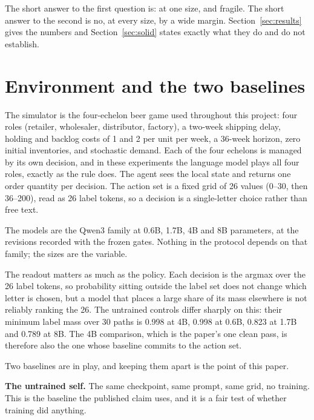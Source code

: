 \documentclass[11pt]{article}
\begin{document}
The short answer to the first question is: at one size, and fragile. The short answer to the second is
no, at every size, by a wide margin. Section~\ref{sec:results} gives the numbers and
Section~\ref{sec:solid} states exactly what they do and do not establish.

\section{Environment and the two baselines}\label{sec:env}

The simulator is the four-echelon beer game \cite{sterman1989,lee1997} used throughout this project:
four roles (retailer, wholesaler, distributor, factory), a two-week shipping delay, holding and backlog
costs of 1 and 2 per unit per week, a 36-week horizon, zero initial inventories, and stochastic
demand. Each of the four echelons is managed by its own decision, and in these experiments the
language model plays all four roles, exactly as the rule does. The agent sees the local state and
returns one order quantity per decision. The action set is a fixed grid of 26 values (0--30, then
36--200), read as 26 label tokens, so a decision is a single-letter choice rather than free text.

The models are the Qwen3 family at 0.6B, 1.7B, 4B and 8B parameters, at the revisions recorded with
the frozen gates. Nothing in the protocol depends on that family; the sizes are the variable.

The readout matters as much as the policy. Each decision is the argmax over the 26 label tokens, so
probability sitting outside the label set does not change which letter is chosen, but a model that
places a large share of its mass elsewhere is not reliably ranking the 26. The untrained controls
differ sharply on this: their minimum label mass over 30 paths is 0.998 at 4B, 0.998 at 0.6B, 0.823 at
1.7B and 0.789 at 8B. The 4B comparison, which is the paper's one clean pass, is therefore also the one
whose baseline commits to the action set.

Two baselines are in play, and keeping them apart is the point of this paper.

\textbf{The untrained self.} The same checkpoint, same prompt, same grid, no training. This is the
baseline the published claim uses, and it is a fair test of whether training did anything.
\end{document}

